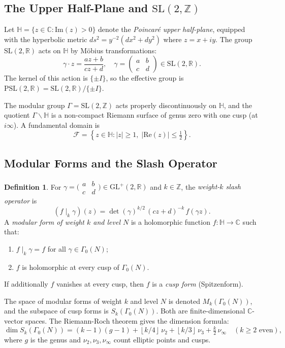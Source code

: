 \documentclass[12pt,a4paper]{amsart}
\theoremstyle{definition}
\newtheorem{definition}[theorem]{Definition}
\newcommand{\HH}{\mathbb{H}}
\newcommand{\ZZ}{\mathbb{Z}}
\newcommand{\RR}{\mathbb{R}}
\newcommand{\CC}{\mathbb{C}}
\newcommand{\GL}{\mathrm{GL}}
\newcommand{\SL}{\mathrm{SL}}
\newcommand{\PSL}{\mathrm{PSL}}
\newcommand{\im}{\mathrm{Im}}
\newcommand{\re}{\mathrm{Re}}
\newcommand{\abs}[1]{\left|#1\right|}
\newcommand{\floor}[1]{\left\lfloor #1 \right\rfloor}
\begin{document}
\subsection{The Upper Half-Plane and \texorpdfstring{$\SL(2,\ZZ)$}{SL(2,Z)}}

Let $\HH = \{z \in \CC : \im(z) > 0\}$ denote the \emph{Poincaré upper half-plane},
equipped with the hyperbolic metric $ds^2 = y^{-2}(dx^2 + dy^2)$ where $z = x+iy$.
The group $\SL(2,\RR)$ acts on $\HH$ by Möbius transformations:
\[
\gamma \cdot z = \frac{az + b}{cz + d}, \quad \gamma = \begin{pmatrix}a&b\\c&d\end{pmatrix}
\in \SL(2,\RR).
\]
The kernel of this action is $\{\pm I\}$, so the effective group is
$\PSL(2,\RR) = \SL(2,\RR)/\{\pm I\}$.

The modular group $\Gamma = \SL(2,\ZZ)$ acts properly discontinuously on $\HH$,
and the quotient $\Gamma \backslash \HH$ is a non-compact Riemann surface of genus
zero with one cusp (at $i\infty$). A fundamental domain is
\[
\mathcal{F} = \left\{ z \in \HH : \abs{z} \geq 1,\; \abs{\re(z)} \leq \tfrac{1}{2} \right\}.
\]

\subsection{Modular Forms and the Slash Operator}

\begin{definition}
For $\gamma = \bigl(\begin{smallmatrix}a&b\\c&d\end{smallmatrix}\bigr) \in \GL^+(2,\RR)$
and $k \in \ZZ$, the \emph{weight-$k$ slash operator} is
\[
(f \mid_k \gamma)(z) = \det(\gamma)^{k/2}\, (cz+d)^{-k}\, f(\gamma z).
\]
A \emph{modular form of weight $k$ and level $N$} is a holomorphic function
$f : \HH \to \CC$ such that:
\begin{enumerate}[label=(\roman*)]
\item $f \mid_k \gamma = f$ for all $\gamma \in \Gamma_0(N)$;
\item $f$ is holomorphic at every cusp of $\Gamma_0(N)$.
\end{enumerate}
If additionally $f$ vanishes at every cusp, then $f$ is a \emph{cusp form} (Spitzenform).
\end{definition}

The space of modular forms of weight $k$ and level $N$ is denoted $M_k(\Gamma_0(N))$,
and the subspace of cusp forms is $S_k(\Gamma_0(N))$. Both are finite-dimensional
$\CC$-vector spaces. The Riemann-Roch theorem gives the dimension formula:
\[
\dim S_k(\Gamma_0(N)) = (k-1)(g-1) + \floor{k/4}\,\nu_2 + \floor{k/3}\,\nu_3 + \tfrac{k}{2}\,\nu_\infty
\quad (k \geq 2 \text{ even}),
\]
where $g$ is the genus and $\nu_2, \nu_3, \nu_\infty$ count elliptic points and cusps.
\end{document}
